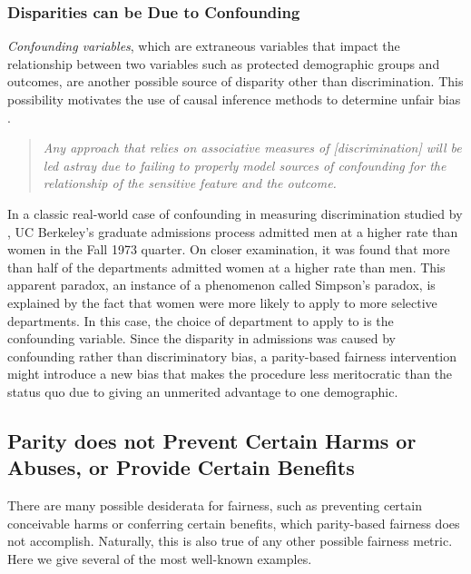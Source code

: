 \documentclass[11pt,dvipdfm]{article}
\begin{document}




\subsubsection{Disparities can be Due to Confounding}
\emph{Confounding variables}, which are extraneous variables that impact the relationship between two variables such as protected demographic groups and outcomes, are another possible source of disparity other than discrimination.  This possibility motivates the use of causal inference methods to determine unfair bias \cite{kusner2017counterfactual, nabi2018fair}.  
\begin{quote}
    \emph{Any approach that relies on associative measures of [discrimination] will be led astray due to failing to properly model sources of confounding for the relationship of the sensitive feature and the outcome. }\cite{nabi2018fair}
\end{quote}
In a classic real-world case of confounding in measuring discrimination studied by \cite{bickel1975sex}, UC Berkeley's graduate admissions process admitted men at a higher rate than women in the Fall 1973 quarter.  On closer examination, it was found that more than half of the departments admitted women at a higher rate than men.  This apparent paradox, an instance of a phenomenon called Simpson's paradox, is explained by the fact that women were more likely to apply to more selective departments.  In this case, the choice of department to apply to is the confounding variable.  Since the disparity in admissions was caused by confounding rather than discriminatory bias, a parity-based fairness intervention might introduce a new bias that makes the procedure less meritocratic than the status quo due to giving an unmerited advantage to one demographic.

\subsection{Parity does not Prevent Certain Harms or Abuses, or Provide Certain Benefits}
There are many possible desiderata for fairness, such as preventing certain conceivable harms or conferring certain benefits, which parity-based fairness does not accomplish. Naturally, this is also true of any other possible fairness metric.  Here we give several of the most well-known examples. 
\end{document}
